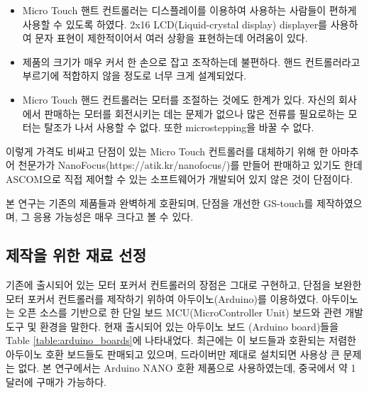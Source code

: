 \begin{itemize}
	\item Micro Touch 핸트 컨트롤러는 디스플레이를 이용하여 사용하는 사람들이 편하게 사용할 수 있도록 하였다. 2x16 LCD(Liquid-crystal display) displayer를 사용하여 문자 표현이 제한적이어서 여러 상황을 표현하는데 어려움이 있다. 	
	\item 제품의 크기가 매우 커서 한 손으로 잡고 조작하는데 불편하다. 핸드 컨트롤러라고 부르기에 적합하지 않을 정도로 너무 크게 설계되었다. 
	\item  Micro Touch 핸드 컨트롤러는 모터를 조절하는 것에도 한계가 있다. 자신의 회사에서 판매하는 모터를 회전시키는 데는 문제가 없으나 많은 전류를 필요로하는 모터는 탈조가 나서 사용할 수 없다. 또한 microstepping을 바꿀 수 없다. 
\end{itemize}

이렇게 가격도 비싸고 단점이 있는 Micro Touch 컨트롤러를 대체하기 위해 한 아마추어 천문가가 NanoFocus(https://atik.kr/nanofocus/)를 만들어 판매하고 있기도 한데 ASCOM으로 직접 제어할 수 있는 소프트웨어가 개발되어 있지 않은 것이 단점이다. 

본 연구는 기존의 제품들과 완벽하게 호환되며, 단점을 개선한 GS-touch를 제작하였으며, 그 응용 가능성은 매우 크다고 볼 수 있다. 


\subsection{제작을 위한 재료 선정}

기존에 출시되어 있는 모터 포커서 컨트롤러의 장점은 그대로 구현하고, 단점을 보완한 모터 포커서 컨트롤러를 제작하기 위하여 아두이노(Arduino)를 이용하였다. 아두이노는 오픈 소스를 기반으로 한 단일 보드 MCU(MicroController Unit) 보드와 관련 개발 도구 및 환경을 말한다. 현재 출시되어 있는 아두이노 보드 (Arduino board)들을 Table \ref{table:arduino_boards}에 나타내었다. 최근에는 이 보드들과 호환되는 저렴한 아두이노 호환 보드들도 판매되고 있으며, 드라이버만 제대로 설치되면 사용상 큰 문제는 없다. 본 연구에서는 Arduino NANO 호환 제품으로 사용하였는데, 중국에서 약 1 달러에 구매가 가능하다.

